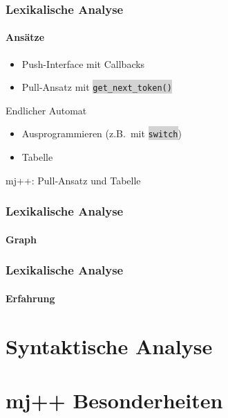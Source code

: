 \documentclass[18pt]{beamer}
\newcommand{\code}[1]{\colorbox{lightgray}{\texttt{\upshape #1}}}
\begin{document}
\begin{frame}
    \frametitle{Lexikalische Analyse}
    \framesubtitle{Ansätze}
    \begin{itemize}
        \item Push-Interface mit Callbacks
        \item Pull-Ansatz mit \code{get\_next\_token()}
    \end{itemize}
    Endlicher Automat
    \begin{itemize}
        \item Ausprogrammieren (z.B.\ mit \code{switch})
        \item Tabelle
    \end{itemize}
    \vskip 1cm
    \begin{center}
        mj++: Pull-Ansatz und Tabelle
    \end{center}
\end{frame}

\begin{frame}
    \frametitle{Lexikalische Analyse}
    \framesubtitle{Graph}
\end{frame}


\begin{frame}
    \frametitle{Lexikalische Analyse}
    \framesubtitle{Erfahrung}
\end{frame}


\section{Syntaktische Analyse}
\begin{frame}
\end{frame}

\section{mj++ Besonderheiten}
\begin{frame}
\end{frame}
\end{document}

